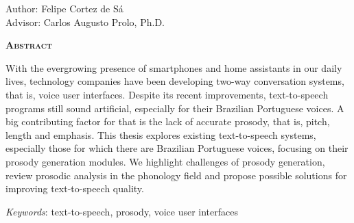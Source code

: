 \begin{center}
	{\Large{\textbf{\tccTitleEn}}}
\end{center}

\vspace{1cm}

\begin{flushright}
	Author: Felipe Cortez de Sá \\
	Advisor: Carlos Augusto Prolo, Ph.D.
\end{flushright}

\vspace{1cm}

\begin{center}
	\Large{\textsc{\textbf{Abstract}}}
\end{center}

\noindent With the evergrowing presence of smartphones and home assistants in
our daily lives, technology companies have been developing two-way conversation
systems, that is, voice user interfaces. Despite its recent improvements,
text-to-speech programs still sound artificial, especially for their Brazilian
Portuguese voices. A big contributing factor for that is the lack of accurate
prosody, that is, pitch, length and emphasis. This thesis explores existing
text-to-speech systems, especially those for which there are Brazilian
Portuguese voices, focusing on their prosody generation modules. We highlight
challenges of prosody generation, review prosodic analysis in the phonology
field and propose possible solutions for improving text-to-speech quality.


\noindent\textit{Keywords}: text-to-speech, prosody, voice user interfaces
